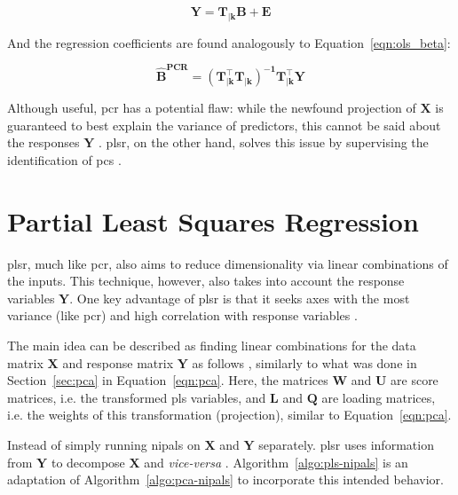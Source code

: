 	\begin{equation}
		\label{eqn:pcr}
		\mathbf{Y = T_{|k} B + E}
	\end{equation}

And the regression coefficients are found analogously to Equation~\ref{eqn:ols_beta}:

\begin{equation}
	\label{eqn:beta-pcr}
	\mathbf{\hat{B}^{\text{PCR}} = (T_{|k}^\intercal T_{|k})^{-1}T_{|k}^\intercal Y}
\end{equation}

Although useful, \acrshort{pcr} has a potential flaw: while the newfound projection of $\mathbf{X}$ is guaranteed to best explain the variance of predictors, this cannot be said about the responses $\mathbf{Y}$ \parencite{james2013introduction}. \acrshort{plsr}, on the other hand, solves this issue by supervising the identification of \acrshort{pc}s \parencite{james2013introduction}.
	
\section{Partial Least Squares Regression}
\label{sec:plsr}

\acrshort{plsr}, much like \acrshort{pcr}, also aims to reduce dimensionality via linear combinations of the inputs. This technique, however, also takes into account the response variables $\mathbf{Y}$. One key advantage of \acrshort{plsr} is that it seeks axes with the most variance (like \acrshort{pcr}) and high correlation with response variables \parencite{friedman2001}.

The main idea can be described as  finding  linear combinations  for the data matrix $\mathbf{X}$ and response matrix $\mathbf{Y}$ as follows \parencite{ng2013}, similarly to what was done in Section~\ref{sec:pca} in Equation~\ref{eqn:pca}. Here, the matrices $\mathbf{W}$ and $\mathbf{U}$ are score matrices, i.e. the transformed \acrshort{pls} variables, and $\mathbf{L}$ and $\mathbf{Q}$ are loading matrices, i.e. the weights of this transformation (projection), similar to Equation~\ref{eqn:pca}.

Instead of simply running \acrshort{nipals} on $\mathbf{X}$ and $\mathbf{Y}$ separately. \acrshort{plsr} uses information from $\mathbf{Y}$ to decompose $\mathbf{X}$ and \textit{vice-versa} \parencite{ng2013}. Algorithm~\ref{algo:pls-nipals} is an adaptation of Algorithm~\ref{algo:pca-nipals} to incorporate this intended behavior.


